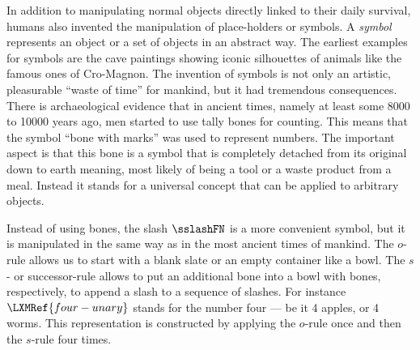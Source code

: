 \documentclass[notes,mh]{mikoslides}
\begin{document}
\begin{module}[id=nat-basic]
\begin{note}
  \begin{omtext}
    In addition to manipulating normal objects directly linked to their daily survival,
    humans also invented the manipulation of place-holders or symbols. A {\emph{symbol}}
    represents an object or a set of objects in an abstract way. The earliest examples for
    symbols are the cave paintings showing iconic silhouettes of animals like the famous
    ones of Cro-Magnon.  The invention of symbols is not only an artistic, pleasurable
    ``waste of time'' for mankind, but it had tremendous consequences. There is
    archaeological evidence that in ancient times, namely at least some 8000 to 10000
    years ago, men started to use tally bones for counting. This means that the symbol
    ``bone with marks'' was used to represent numbers. The important aspect is that this
    bone is a symbol that is completely detached from its original down to earth meaning,
    most likely of being a tool or a waste product from a meal. Instead it stands for a
    universal concept that can be applied to arbitrary objects.
  \end{omtext}

  \begin{omtext}
    Instead of using bones, the slash $\sslashFN$ is a more convenient symbol, but it is
    manipulated in the same way as in the most ancient times of mankind. The $o$-rule
    allows us to start with a blank slate or an empty container like a bowl. The $s$- or
    successor-rule allows to put an additional bone into a bowl with bones, respectively,
    to append a slash to a sequence of slashes. For instance $\LXMRef{four-unary}$ stands
   for the number four --- be it 4 apples, or 4 worms. This representation is constructed
    by applying the $o$-rule once and then the $s$-rule four times.
  \end{omtext}
\end{note}
\end{module}
\end{document}
